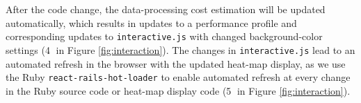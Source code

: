 After the code change, the data-processing cost estimation will be updated automatically, which results in updates to a performance profile 
and corresponding updates to {\tt interactive.js} %
with changed background-color settings ({\large \textcircled{\small 4}}  
in Figure \ref{fig:interaction}).
The changes in {\tt interactive.js} lead to
an automated refresh in the browser with the updated heat-map display, as we use  the Ruby 
{\tt react-rails-hot-loader} to enable
automated refresh at every change in the Ruby source code or 
heat-map display code
({\large \textcircled{\small 5}}  in Figure \ref{fig:interaction}).




